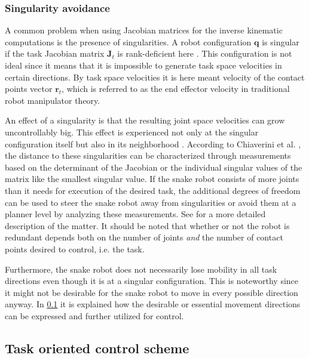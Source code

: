 \subsubsection{Singularity avoidance}

A common problem when using Jacobian matrices for the inverse kinematic computations is the presence of singularities. A robot configuration $\mathbf{q}$ is singular if the task Jacobian matrix $\mathbf{J}_t$ is rank-deficient here \cite{chiaverini2008kinematically}. This configuration is not ideal since it means that it is impossible to generate task space velocities in certain directions. By task space velocities it is here meant velocity of the contact points vector $\mathbf{r}_t$, which is referred to as the end effector velocity in traditional robot manipulator theory.

An effect of a singularity is that the resulting joint space velocities can grow uncontrollably big. This effect is experienced not only at the singular configuration itself but also in its neighborhood \cite{chiaverini2008kinematically}. According to Chiaverini et al. \cite{chiaverini2008kinematically}, the distance to these singularities can be characterized through measurements based on the determinant of the Jacobian or the individual singular values of the matrix like the smallest singular value. If the snake robot consists of more joints than it needs for execution of the desired task, the additional degrees of freedom can be used to steer the snake robot away from singularities or avoid them at a planner level by analyzing these measurements. See \cite{chiaverini2008kinematically} for a more detailed description of the matter.
It should be noted that whether or not the robot is redundant depends both on the number of joints \textit{and} the number of contact points desired to control, i.e. the task.

Furthermore, the snake robot does not necessarily lose mobility in all task directions even though it is at a singular configuration. This is noteworthy since it might not be desirable for the snake robot to move in every possible direction anyway. In \ref{subsec:task-oriented} it is explained how the desirable or essential movement directions can be expressed and further utilized for control.


\subsection{Task oriented control scheme}\label{subsec:task-oriented}


